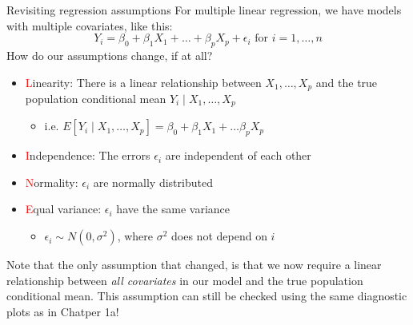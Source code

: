 \documentclass[10pt,t]{beamer}
\begin{document}
\begin{frame}{Revisiting regression assumptions}
For multiple linear regression, we have models with multiple covariates, like this:
$$
Y_i = \beta_0 + \beta_1 X_1 + \dots + \beta_p X_p + \epsilon_i \text{ for } i = 1, \dots, n
$$
How do our assumptions change, if at all? \pause

\vspace{0.3cm}

\begin{itemize}
	\item \textcolor{red}{L}inearity: There is a linear relationship between \color{cyan}$X_1, \dots, X_p$ \color{black} and the true population conditional mean \color{cyan}$Y_i \mid X_1, \dots, X_p$
	\begin{itemize}
		\item i.e. \color{cyan} $E[Y_i \mid X_1, \dots, X_p] = \beta_0 + \beta_1 X_1 + \dots \beta_p X_p$  \color{black}
	\end{itemize} 
	\item \textcolor{red}{I}\color{black}ndependence: The errors $\epsilon_i$ are independent of each other
	\item \textcolor{red}{N}ormality: $\epsilon_i$ are normally distributed
	\item \textcolor{red}{E}qual variance: $\epsilon_i$ have the same variance
	\begin{itemize}
		\item $\epsilon_i \sim N(0, \sigma^2)$, where $\sigma^2$ does not depend on $i$
	\end{itemize}
\end{itemize}

\vspace{0.2cm}

Note that the only assumption that changed, is that we now require a linear relationship between \textit{all covariates} in our model and the true population conditional mean. This assumption can still be checked using the same diagnostic plots as in Chatper 1a!

\end{frame}
\end{document}
